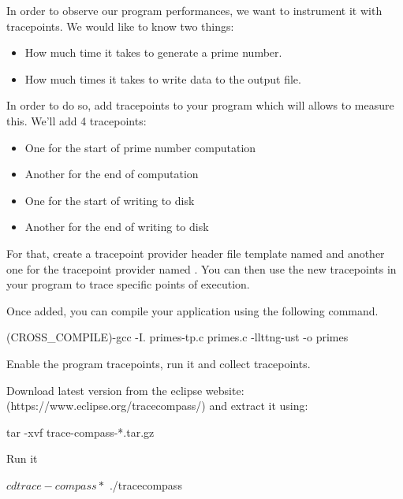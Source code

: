 In order to observe our program performances, we want to instrument it with
tracepoints. We would like to know two things:

\begin{itemize}
  \item How much time it takes to generate a prime number.
  \item How much times it takes to write data to the output file.
\end{itemize}

In order to do so, add tracepoints to your program which will allows to measure
this. We'll add 4 tracepoints:

\begin{itemize}
  \item One for the start of prime number computation
  \item Another for the end of computation
  \item One for the start of writing to disk
  \item Another for the end of writing to disk
\end{itemize}

For that, create a tracepoint provider header file template named
 and another one for the tracepoint provider named
. You can then use the new tracepoints in your program to
trace specific points of execution.

Once added, you can compile your application using the following command.

\begin{bashinput}
$ $(CROSS_COMPILE)-gcc -I. primes-tp.c primes.c  -llttng-ust -o primes
\end{bashinput}

Enable the program tracepoints, run it and collect tracepoints.

Download  latest version from the eclipse website:
(https://www.eclipse.org/tracecompass/) and extract it using:

\begin{bashinput}
  tar -xvf trace-compass-*.tar.gz
\end{bashinput}

Run it
\begin{bashinput}
$ cd trace-compass*
$ ./tracecompass
\end{bashinput}
